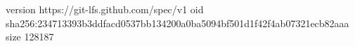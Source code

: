 version https://git-lfs.github.com/spec/v1
oid sha256:234713393b3ddfacd0537bb134200a0ba5094bf501d1f42f4ab07321ecb82aaa
size 128187
